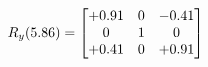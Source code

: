 \documentclass[preview]{standalone}
\begin{document}
\begin{align*}
\special{dvisvgm:raw <g id='unique000'>}R_{y}(5.86) = \begin{bmatrix}+0.91 & 0 & -0.41 \\0 & 1 & 0 \\+0.41 & 0 & +0.91\end{bmatrix}\special{dvisvgm:raw </g>}
\end{align*}
\end{document}
